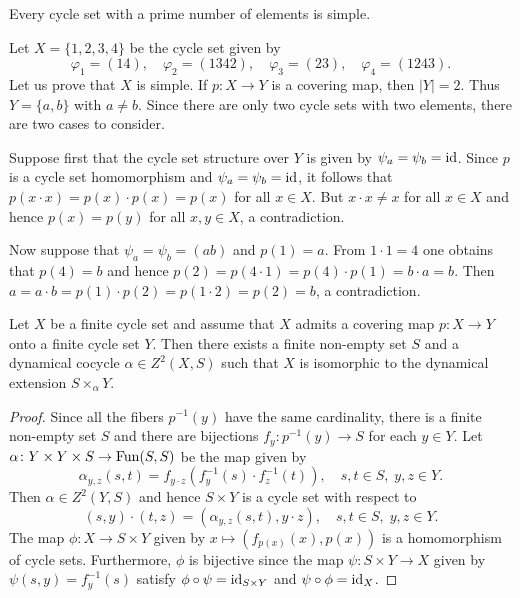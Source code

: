 \begin{example}
	Every cycle set with a prime number of elements is simple. 
\end{example}

\begin{example}
	Let $X=\{1,2,3,4\}$ be the cycle set given by 
	\[
	\varphi_1=(14),\quad
	\varphi_2=(1342),\quad
	\varphi_3=(23),\quad
	\varphi_4=(1243).
	\]
	Let us prove that $X$ is simple. If $p\colon X\to Y$ is a covering map,
	then $|Y|=2$. Thus $Y=\{a,b\}$ with $a\ne b$. Since there
	are only two cycle sets with two elements, there are two cases to consider.  

	Suppose first that the cycle set structure over $Y$ is given by
	$\psi_a=\psi_b=\operatorname{id}$. Since $p$ is a cycle set homomorphism and
	$\psi_a=\psi_b=\operatorname{id}$, it follows that $p(x\cdot x)=p(x)\cdot p(x)=p(x)$ for
	all $x\in X$. But $x\cdot x\ne x$ for all $x\in X$ and hence  $p(x)=p(y)$
	for all $x,y\in X$, a contradiction.

	Now suppose that $\psi_a=\psi_b=(ab)$ and $p(1)=a$. From $1\cdot 1=4$ one
	obtains that $p(4)=b$ and hence $p(2)=p(4\cdot 1)=p(4)\cdot p(1)=b\cdot
	a=b$.  Then $a=a\cdot b=p(1)\cdot p(2)=p(1\cdot 2)=p(2)=b$, a
	contradiction.
\end{example}

\begin{theorem}
	\label{thm:dynamical}
	Let $X$ be a finite cycle set and assume that $X$ admits a covering map
	$p:X\to Y$ onto a finite cycle set $Y$.  Then there exists 
	a finite non-empty set $S$ and a dynamical cocycle $\alpha\in Z^2(X,S)$
	such that $X$ is isomorphic to the dynamical extension $S\times_\alpha Y$.
\end{theorem}

\begin{proof}
	Since all the fibers $p^{-1}(y)$ have the same
	cardinality, there is a finite
	non-empty set $S$ and there are bijections $f_y\colon p^{-1}(y)\to S$ for
	each $y\in Y$. Let $\alpha\colon Y\times Y\times S\to\operatorname{Fun}(S,S)$ be the map
	given by
	\[
		\alpha_{y,z}(s,t)=f_{y\cdot z}(f^{-1}_y(s)\cdot f^{-1}_{z}(t)),\quad
		s,t\in S,\;y,z\in Y. 
	\]
	Then $\alpha\in Z^2(Y,S)$ and hence  
	$S\times Y$ is a cycle set with respect to 
	\[
		(s,y)\cdot (t,z)=(\alpha_{y,z}(s,t),y\cdot z),\quad
		s,t\in S,\;y,z\in Y. 
	\]
	The map $\phi\colon X\to S\times Y$ given by $x\mapsto
	(f_{p(x)}(x),p(x))$ is a homomorphism of cycle sets. 
	Furthermore, $\phi$ is
	bijective since the map $\psi\colon S\times Y\to X$ given
	by $\psi(s,y)=f^{-1}_{y}(s)$ satisfy $\phi\circ\psi=\operatorname{id}_{S\times Y}$
	and $\psi\circ\phi=\operatorname{id}_X$. 
\end{proof}

